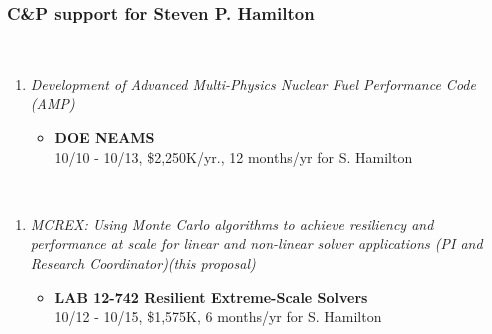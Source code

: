 
\subsubsection{C\&P support for Steven P. Hamilton}

\\

\begin{enumerate}
  \vspace{-2ex}
  \parskip = -2pt
  
  
\item{\em Development of Advanced Multi-Physics Nuclear Fuel Performance Code (AMP)}
  \begin{itemize}
  \item
    {\bf DOE NEAMS}\\
    10/10 - 10/13, \$2,250K/yr., 12 months/yr for S. Hamilton
  \end{itemize}

\end{enumerate}


\\

\begin{enumerate}
  \vspace{-2ex}
  \parskip = -2pt

\item{\em MCREX: Using Monte Carlo algorithms to achieve resiliency 
    and performance at scale for linear and non-linear solver
    applications (PI and Research Coordinator)(this proposal)}
  \begin{itemize}
  \item
    {\bf LAB 12-742 Resilient Extreme-Scale Solvers}\\
    10/12 - 10/15, \$1,575K, 6 months/yr for S. Hamilton
  \end{itemize}
  
\end{enumerate}



